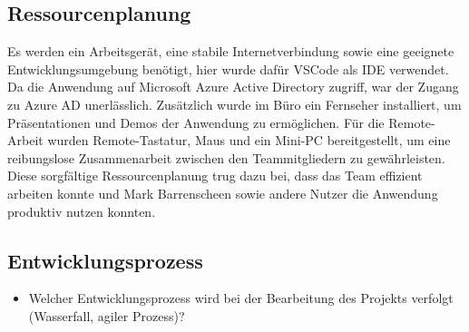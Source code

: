 \subsection{Ressourcenplanung}
\label{sec:Ressourcenplanung}

Es werden ein Arbeitsgerät, eine stabile Internetverbindung sowie eine geeignete Entwicklungsumgebung benötigt, hier wurde dafür VSCode als IDE verwendet.
Da die Anwendung auf Microsoft Azure Active Directory zugriff, war der Zugang zu Azure AD unerlässlich.
Zusätzlich wurde im Büro ein Fernseher installiert, um Präsentationen und Demos der Anwendung zu ermöglichen.
Für die Remote-Arbeit wurden Remote-Tastatur, Maus und ein Mini-PC bereitgestellt, um eine reibungslose Zusammenarbeit zwischen den Teammitgliedern zu gewährleisten.
Diese sorgfältige Ressourcenplanung trug dazu bei, dass das Team effizient arbeiten konnte und Mark Barrenscheen sowie andere Nutzer die Anwendung produktiv nutzen konnten.


\subsection{Entwicklungsprozess}
\label{sec:Entwicklungsprozess}
\begin{itemize}
	\item Welcher Entwicklungsprozess wird bei der Bearbeitung des Projekts verfolgt (\zB Wasserfall, agiler Prozess)?
\end{itemize}
